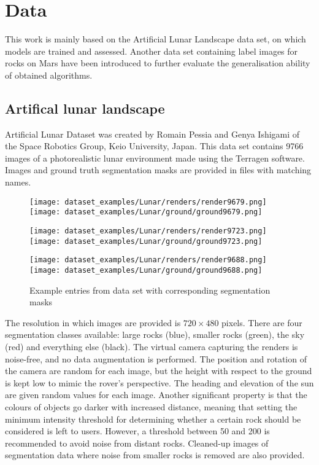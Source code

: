 \documentclass[a4paper,twoside,12pt]{book}
\begin{document}
\section{Data}
This work is mainly based on the Artificial Lunar Landscape data set, on which models are trained and assessed. Another data set containing label images for rocks on Mars have been introduced to further evaluate the generalisation ability of obtained algorithms.

\subsection{Artifical lunar landscape}
Artificial Lunar Dataset was created by Romain Pessia and Genya Ishigami of the Space Robotics Group, Keio University, Japan. This data set contains 9766 images of a photorealistic lunar environment made using the Terragen software. Images and ground truth segmentation masks are provided in files with matching names.

\begin{figure}[h!]
    \centering
    \texttt{[image: dataset\_examples/Lunar/renders/render9679.png]}
    \texttt{[image: dataset\_examples/Lunar/ground/ground9679.png]}

    \texttt{[image: dataset\_examples/Lunar/renders/render9723.png]}
    \texttt{[image: dataset\_examples/Lunar/ground/ground9723.png]}

    \texttt{[image: dataset\_examples/Lunar/renders/render9688.png]}
    \texttt{[image: dataset\_examples/Lunar/ground/ground9688.png]}
    \caption{Example entries from data set with corresponding segmentation masks}
    \label{fig:data_example1}
\end{figure}

The resolution in which images are provided is $720 \times 480$ pixels. There are four segmentation classes available: large rocks (blue), smaller rocks (green), the sky (red) and everything else (black). The virtual camera capturing the renders is noise-free, and no data augmentation is performed. The position and rotation of the camera are random for each image, but the height with respect to the ground is kept low to mimic the rover's perspective. The heading and elevation of the sun are given random values for each image. Another significant property is that the colours of objects go darker with increased distance, meaning that setting the minimum intensity threshold for determining whether a certain rock should be considered is left to users. However, a threshold between 50 and 200 is recommended to avoid noise from distant rocks. Cleaned-up images of segmentation data where noise from smaller rocks is removed are also provided.
\end{document}
